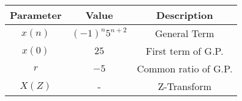 \begin{tabular}{|c|c|c|}
    \hline
     \textbf{Parameter} & \textbf{Value} &
     \textbf{Description}\\
    \hline 
     $x(n)$ &  $(-1)^{n}5^{n+2}$ & General Term\\
    \hline 
     $x(0)$ &  $25$ & First term of G.P.\\
     
    \hline
     $r$ & $-5$ & Common ratio of G.P.  \\
      \hline
      $X(Z)$ & - & Z-Transform \\
      \hline
    
  
								      
\end{tabular}
